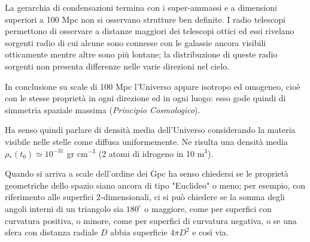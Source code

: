 La gerarchia di condensazioni termina con i super-ammassi e a dimensioni
superiori a 100 Mpc non si osservano strutture ben definite.  I radio telescopi
permettono di osservare a distanze maggiori dei telescopi ottici ed essi
rivelano sorgenti radio di cui alcune sono connesse con le galassie ancora
visibili otticamente mentre altre sono più lontane; la distribuzione di queste
radio sorgenti non presenta differenze nelle varie direzioni nel cielo.

{In conclusione su scale di 100 Mpc l'Universo appare isotropo ed omogeneo, cioè
  con le stesse proprietà in ogni direzione ed in ogni luogo: esso gode quindi
  di simmetria spaziale massima (\emph{Principio Cosmologico}).}

Ha senso quindi parlare di densità media dell'Universo considerando la materia
visibile nelle stelle come diffusa uniformemente.  Ne risulta una densità media
$\rho_*(t_0) \simeq 10^{-31}$ gr cm$^{-3}$ (2 atomi di idrogeno in 10 m$^3$).

Quando si arriva a scale dell'ordine dei Gpc ha senso chiedersi se le proprietà
geometriche dello spazio siano ancora di tipo "Euclideo" o meno; per esempio,
con riferimento alle superfici 2-dimensionali, ci si può chiedere se la somma
degli angoli interni di un triangolo sia $180^{\circ}$ o maggiore, come per
superfici con curvatura positiva, o minore, come per superfici di curvatura
negativa, o se una sfera con distanza radiale $D$ abbia superficie $4 \pi D^2$ e
così via.

